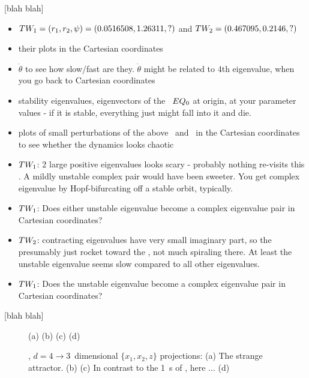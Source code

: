 \documentclass[aip,cha,
reprint,
secnumarabic,
nofootinbib, tightenlines,
nobibnotes, showkeys, showpacs,
groupedaddress,
]{revtex4-1}
\begin{document}
 [blah blah]

\begin{itemize}
  \item $TW_{1} = (r_1,r_2,\psi)=(0.0516508, 1.26311,?)$ and
        $TW_{2} = (0.467095,0.2146,?)$
  \item their plots in the Cartesian coordinates
  \item $\dot{\theta}$ to see how slow/fast are they. $\dot{\theta}$
        might be related to 4th eigenvalue, when you go back
        to Cartesian coordinates
  \item stability eigenvalues, eigenvectors of the \eqv\ $EQ_{0}$ at
        origin, at your parameter values - if it is stable, everything
        just might fall into it and die.
  \item plots of small perturbations of the above \eqv\ and \reqva\ in
        the Cartesian coordinates to see whether the dynamics looks
        chaotic
  \item $TW_{1}$: 2 large positive eigenvalues looks scary - probably
        nothing re-visits this \reqv. A mildly unstable complex pair
        would have been sweeter. You get complex eigenvalue by Hopf-bifurcating off a
        stable orbit, typically.
  \item $TW_{1}$: Does either unstable eigenvalue become a complex
        eigenvalue pair in Cartesian coordinates?
  \item $TW_{2}$: contracting eigenvalues have very small imaginary
        part, so the presumably just rocket toward the \reqv, not much
        spiraling there. At least the unstable eigenvalue seems slow
        compared to all other eigenvalues.
  \item $TW_{1}$: Does the unstable eigenvalue become a complex
        eigenvalue pair in Cartesian coordinates?
\end{itemize}

 [blah blah]



\begin{figure}
  	\begin{center}
(a)
(b)
(c)
(d)
    \end{center}
  \caption{
  \twoMode, $d=4 \to 3$~dimensional $\{x_1,x_2,z\}$ projections:
  (a)
  The strange attractor.
  (b)
 (c)
 In contrast
 to the 1\dmn\ \poincBord s of , here ...
 (d)
  }
\label{fig:2ModeAtlas}
\end{figure}
\end{document}
